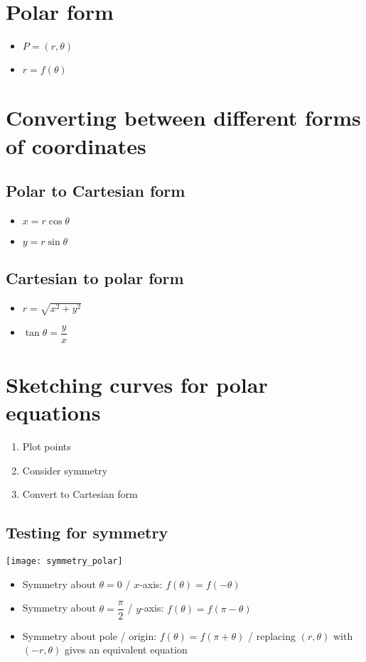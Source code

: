 \section{Polar form}
\begin{itemize}
    \item $P=(r,\theta)$
    \item $r=f(\theta)$
\end{itemize}

\section{Converting between different forms of coordinates}
\subsection{Polar to Cartesian form}
\begin{itemize}
    \item $x=r\cos\theta$
    \item $y=r\sin\theta$
\end{itemize}
\subsection{Cartesian to polar form}
\begin{itemize}
    \item $r=\sqrt{x^2+y^2}$
    \item $\tan\theta=\dfrac{y}{x}$
\end{itemize}


\section{Sketching curves for polar equations}
\begin{enumerate}
    \item Plot points
    \item Consider symmetry
    \item Convert to Cartesian form
\end{enumerate}

\subsection{Testing for symmetry}
\texttt{[image: symmetry\_polar]}
\begin{itemize}
    \item Symmetry about $\theta=0$ / $x$-axis: $f(\theta)=f(-\theta)$
    \item Symmetry about $\theta=\dfrac{\pi}{2}$ / $y$-axis: $f(\theta)=f(\pi-\theta)$
    \item Symmetry about pole / origin: $f(\theta)=f(\pi+\theta)$ / replacing $(r,\theta)$ with $(-r,
              \theta)$ gives an equivalent equation
\end{itemize}


